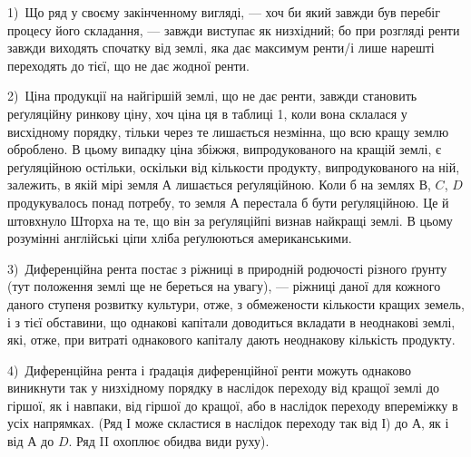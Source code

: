 
1)~Що ряд у своєму закінченному вигляді, — хоч би який завжди був перебіг процесу його складання, —
завжди виступає як низхідний; бо при розгляді ренти завжди виходять спочатку від землі, яка дає
максимум ренти/і лише нарешті переходять до тієї, що не дає жодної ренти.

2)~Ціна продукції на найгіршій землі, що не дає ренти, завжди становить реґуляційну ринкову ціну,
хоч ціна ця в таблиці 1, коли вона склалася у висхідному порядку, тільки через те лишається
незмінна, що всю кращу землю оброблено. В цьому випадку ціна збіжжя, випродукованого на кращій
землі, є реґуляційною остільки, оскільки від кількости продукту, випродукованого на ній, залежить, в
якій мірі земля $А$ лишається реґуляційною. Коли б на землях $В$, $C$, $D$ продукувалось понад потребу, то
земля $А$ перестала б бути реґуляційною. Це й штовхнуло Шторха на те, що він за реґуляційпі визнав
найкращі землі. В цьому розумінні англійські ціпи хліба реґулюються американськими.

3)~Диференційна рента постає з ріжниці в природній родючості різного ґрунту (тут положення землі ще
не береться на увагу), — ріжниці даної для кожного даного ступеня розвитку культури, отже, з
обмежености кількости кращих земель, і з тієї обставини, що однакові капітали доводиться вкладати в
неоднакові землі, які, отже, при витраті однакового капіталу дають неоднакову кількість продукту.

4)~Диференційна рента і ґрадація диференційної ренти можуть однаково виникнути так у низхідному
порядку в наслідок переходу від кращої землі до гіршої, як і навпаки, від гіршої до кращої, або в
наслідок переходу впереміжку в усіх напрямках. (Ряд І може скластися в наслідок переходу так від І)
до $А$, як і від $А$ до $D$. Ряд II охоплює обидва види руху).

